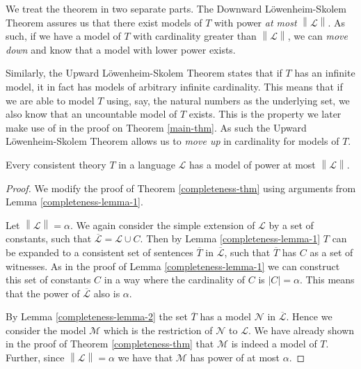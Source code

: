 \documentclass[../../main.tex]{subfiles}
\begin{document}
We treat the theorem in two separate parts.
The Downward Löwenheim-Skolem Theorem assures us that there exist models of $T$ with power \emph{at most} $\left\lVert \mathcal{L}\right\rVert$.
As such, if we have a model of $T$ with cardinality greater than $\left\lVert \mathcal{L} \right\rVert$, 
we can \emph{move down} and know that a model with lower power exists.

Similarly, the Upward Löwenheim-Skolem Theorem states that if $T$ has an infinite model, it in fact has models of arbitrary infinite cardinality.
This means that if we are able to model $T$ using, say, the natural numbers as the underlying set,
we also know that an uncountable model of $T$ exists.
This is the property we later make use of in the proof on Theorem \ref{main-thm}.
As such the Upward Löwenheim-Skolem Theorem allows us to \emph{move up} in cardinality for models of $T$.

\begin{theorem}\label{down-lowenheim-skolem}\cite[Corollary 2.1.4]{Cha90}
    Every consistent theory $T$ in a language $\mathcal{L}$ has a model of power at most $\left\lVert \mathcal{L} \right\rVert$.
\end{theorem}

\begin{proof}
    We modify the proof of Theorem \ref{completeness-thm} using arguments from Lemma \ref{completeness-lemma-1}.

    Let $\left\lVert \mathcal{L} \right\rVert = \alpha$.
    We again consider the simple extension of $\mathcal{L}$ by a set of constants, such that $\overline{\mathcal{L}} = \mathcal{L} \cup C$.
    Then by Lemma \ref{completeness-lemma-1} $T$ can be expanded to a consistent set of sentences $\overline{T}$ in $\overline{\mathcal{L}}$, 
    such that $\overline{T}$ has $C$ as a set of witnesses.
    As in the proof of Lemma \ref{completeness-lemma-1} we can construct this set of constants $C$ in a way where the cardinality of $C$ is $\left\lvert C\right\rvert = \alpha$.
    This means that the power of $\overline{\mathcal{L}}$ also is $\alpha$.

    By Lemma \ref{completeness-lemma-2} the set $\overline{T}$ has a model $\mathcal{N}$ in $\overline{\mathcal{L}}$.
    Hence we consider the model $\mathcal{M}$ which is the restriction of $\mathcal{N}$ to $\mathcal{L}$.
    We have already shown in the proof of Theorem \ref{completeness-thm} that $\mathcal{M}$ is indeed a model of $T$.
    Further, since $\left\lVert \mathcal{L} \right\rVert = \alpha$ we have that $\mathcal{M}$ has power of at most $\alpha$.
\end{proof}
\end{document}
